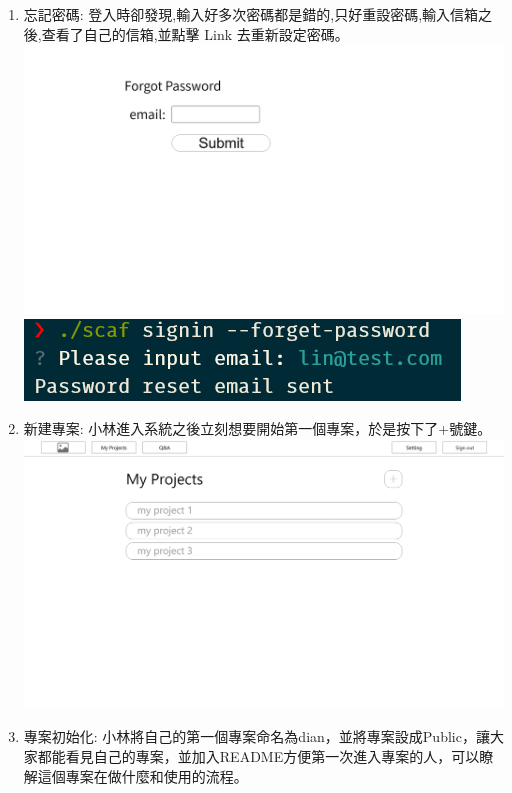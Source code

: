 \documentclass{report}
\begin{document}
\begin{enumerate}[label=(\Alph*)]
  \item 忘記密碼: 登入時卻發現,輸入好多次密碼都是錯的,只好重設密碼,輸入信箱之後,查看了自己的信箱,並點擊 Link 去重新設定密碼。\\
  \includegraphics[width=\textwidth]{assets/wireframe/forgot_password.png}
  \includegraphics[width=\textwidth]{assets/wireframe/forgot_password_CLI.png}
  \item 新建專案: 小林進入系統之後立刻想要開始第一個專案，於是按下了+號鍵。\\
  \includegraphics[width=\textwidth]{assets/wireframe/My_Projects.png}
  \item 專案初始化: 小林將自己的第一個專案命名為dian，並將專案設成Public，讓大家都能看見自己的專案，並加入README方便第一次進入專案的人，可以瞭解這個專案在做什麼和使用的流程。\\

\end{enumerate}
\end{document}
